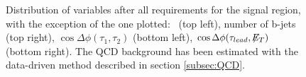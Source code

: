  \begin{figure}[H]
 \begin{center}
 \captionsetup[subfloat]{farskip=0pt,captionskip=0.0cm,labelformat=empty}
 \end{center}
 \caption{Distribution of variables after all requirements for the signal region, with the exception of the
one plotted: \MET~(top left), number of b-jets (top right), $\cos\Delta \phi (\tau_{1},\tau_{2})$ (bottom left), 
$\cos\Delta \phi (\tau_{lead}, \not\!\!E_T)$ (bottom right). The QCD background has been estimated with 
the data-driven method described in section \ref{subsec:QCD}.}
\label{nminusone} 
 \end{figure}

